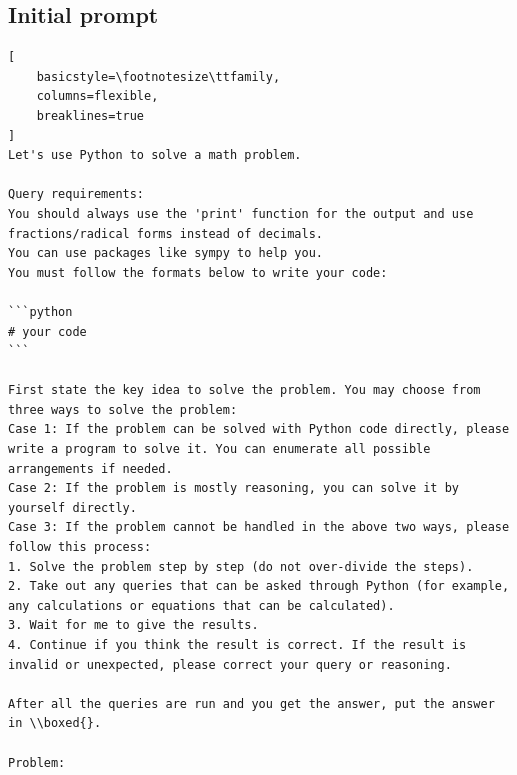 \subsection{Initial prompt}
\label{sec:ag2-mathchat-original-prompt}
\begin{lstlisting}[
    basicstyle=\footnotesize\ttfamily,
    columns=flexible,
    breaklines=true
]
Let's use Python to solve a math problem.

Query requirements:
You should always use the 'print' function for the output and use fractions/radical forms instead of decimals.
You can use packages like sympy to help you.
You must follow the formats below to write your code:

```python
# your code
```

First state the key idea to solve the problem. You may choose from three ways to solve the problem:
Case 1: If the problem can be solved with Python code directly, please write a program to solve it. You can enumerate all possible arrangements if needed.
Case 2: If the problem is mostly reasoning, you can solve it by yourself directly.
Case 3: If the problem cannot be handled in the above two ways, please follow this process:
1. Solve the problem step by step (do not over-divide the steps).
2. Take out any queries that can be asked through Python (for example, any calculations or equations that can be calculated).
3. Wait for me to give the results.
4. Continue if you think the result is correct. If the result is invalid or unexpected, please correct your query or reasoning.

After all the queries are run and you get the answer, put the answer in \\boxed{}.

Problem:
\end{lstlisting}


